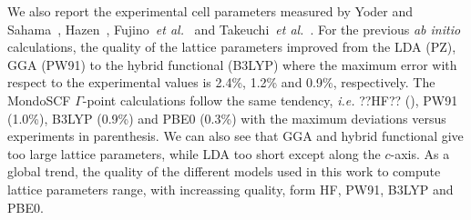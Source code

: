 \documentclass[pra,twocolumn,twocolumngrid,superbib]{revtex4} %
\begin{document}
We also report the experimental cell parameters
measured by Yoder and Sahama~\cite{HYoder57}, Hazen~\cite{RHazen76}, 
Fujino~\emph{et al.}~\cite{KFujino81} and Takeuchi~\emph{et al.}~\cite{YTakeuchi84}.
For the previous \emph{ab initio} calculations, the quality of the lattice parameters
improved from the LDA (PZ), GGA (PW91) to the hybrid functional (B3LYP) where the maximum error
with respect to the experimental values is 2.4\%, 1.2\% and 0.9\%, respectively. 
The {\sc MondoSCF} $\Gamma$-point calculations follow the same tendency, \emph{i.e.} 
??HF?? (), PW91 (1.0\%), B3LYP (0.9\%) and PBE0 (0.3\%) with the maximum 
deviations versus experiments in parenthesis. We can also see that GGA 
and hybrid functional give too large lattice parameters, while LDA too short except 
along the $c$-axis. As a global trend, the quality of the different models used in this work
to compute lattice parameters range, with increassing quality, form HF, PW91, B3LYP and PBE0.
\end{document}
